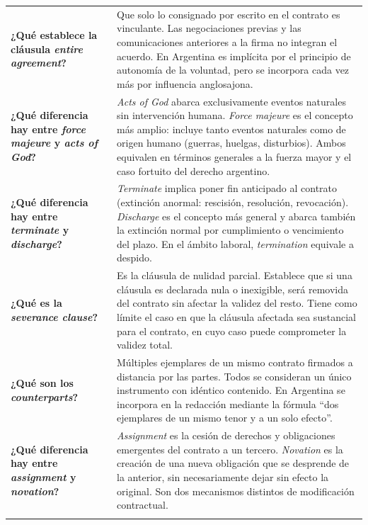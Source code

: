 \documentclass[12pt,oneside]{book}
\begin{document}
\begin{table}[H]
\begin{tabularx}{\textwidth}{
    >{\raggedright\arraybackslash}p{}
    >{\raggedright\arraybackslash}X
}
\textbf{¿Qué establece la cláusula \textit{entire agreement}?} &
Que solo lo consignado por escrito en el contrato es vinculante. Las
negociaciones previas y las comunicaciones anteriores a la firma no
integran el acuerdo. En Argentina es implícita por el principio de
autonomía de la voluntad, pero se incorpora cada vez más por influencia
anglosajona. \\
\addlinespace

\textbf{¿Qué diferencia hay entre \textit{force majeure} y \textit{acts of God}?} &
\textit{Acts of God} abarca exclusivamente eventos naturales sin intervención
humana. \textit{Force majeure} es el concepto más amplio: incluye tanto eventos
naturales como de origen humano (guerras, huelgas, disturbios). Ambos
equivalen en términos generales a la fuerza mayor y el caso fortuito del
derecho argentino. \\
\addlinespace

\textbf{¿Qué diferencia hay entre \textit{terminate} y \textit{discharge}?} &
\textit{Terminate} implica poner fin anticipado al contrato (extinción anormal:
rescisión, resolución, revocación). \textit{Discharge} es el concepto más
general y abarca también la extinción normal por cumplimiento o vencimiento
del plazo. En el ámbito laboral, \textit{termination} equivale a despido. \\
\addlinespace

\textbf{¿Qué es la \textit{severance clause}?} &
Es la cláusula de nulidad parcial. Establece que si una cláusula es declarada
nula o inexigible, será removida del contrato sin afectar la validez del
resto. Tiene como límite el caso en que la cláusula afectada sea sustancial
para el contrato, en cuyo caso puede comprometer la validez total. \\
\addlinespace

\textbf{¿Qué son los \textit{counterparts}?} &
Múltiples ejemplares de un mismo contrato firmados a distancia por las partes.
Todos se consideran un único instrumento con idéntico contenido. En Argentina
se incorpora en la redacción mediante la fórmula ``dos ejemplares de un mismo
tenor y a un solo efecto''. \\
\addlinespace

\textbf{¿Qué diferencia hay entre \textit{assignment} y \textit{novation}?} &
\textit{Assignment} es la cesión de derechos y obligaciones emergentes del
contrato a un tercero. \textit{Novation} es la creación de una nueva
obligación que se desprende de la anterior, sin necesariamente dejar sin
efecto la original. Son dos mecanismos distintos de modificación contractual. \\
\addlinespace


\end{tabularx}
\end{table}
\end{document}
